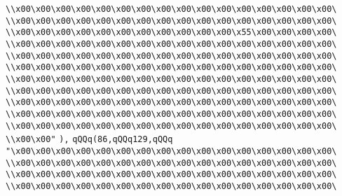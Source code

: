 \verb|\\x00\x00\x00\x00\x00\x00\x00\x00\x00\x00\x00\x00\x00\x00\x00\x00\|\newline
\verb|\\x00\x00\x00\x00\x00\x00\x00\x00\x00\x00\x00\x00\x00\x00\x00\x00\|\newline
\verb|\\x00\x00\x00\x00\x00\x00\x00\x00\x00\x00\x00\x55\x00\x00\x00\x00\|\newline
\verb|\\x00\x00\x00\x00\x00\x00\x00\x00\x00\x00\x00\x00\x00\x00\x00\x00\|\newline
\verb|\\x00\x00\x00\x00\x00\x00\x00\x00\x00\x00\x00\x00\x00\x00\x00\x00\|\newline
\verb|\\x00\x00\x00\x00\x00\x00\x00\x00\x00\x00\x00\x00\x00\x00\x00\x00\|\newline
\verb|\\x00\x00\x00\x00\x00\x00\x00\x00\x00\x00\x00\x00\x00\x00\x00\x00\|\newline
\verb|\\x00\x00\x00\x00\x00\x00\x00\x00\x00\x00\x00\x00\x00\x00\x00\x00\|\newline
\verb|\\x00\x00\x00\x00\x00\x00\x00\x00\x00\x00\x00\x00\x00\x00\x00\x00\|\newline
\verb|\\x00\x00\x00\x00\x00\x00\x00\x00\x00\x00\x00\x00\x00\x00\x00\x00\|\newline
\verb|\\x00\x00\x00\x00\x00\x00\x00\x00\x00\x00\x00\x00\x00\x00\x00\x00\|\newline
\verb|\\x00\x00"|\newline
\verb|),|\newline
\verb|qQQq(86,qQQq129,qQQq|\newline
\verb|"\x00\x00\x00\x00\x00\x00\x00\x00\x00\x00\x00\x00\x00\x00\x00\x00\|\newline
\verb|\\x00\x00\x00\x00\x00\x00\x00\x00\x00\x00\x00\x00\x00\x00\x00\x00\|\newline
\verb|\\x00\x00\x00\x00\x00\x00\x00\x00\x00\x00\x00\x00\x00\x00\x00\x00\|\newline
\verb|\\x00\x00\x00\x00\x00\x00\x00\x00\x00\x00\x00\x00\x00\x00\x00\x00\|\newline
